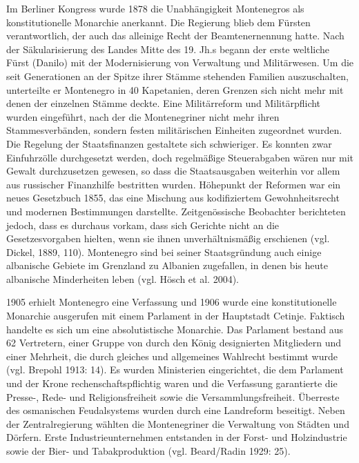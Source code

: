 Im Berliner Kongress wurde 1878 die Unabhängigkeit Montenegros als konstitutionelle Monarchie anerkannt. Die Regierung blieb dem Fürsten verantwortlich, der auch das alleinige Recht der Beamtenernennung hatte. Nach der Säkularisierung des Landes Mitte des 19. Jh.s begann der erste weltliche Fürst (Danilo) mit der Modernisierung von Verwaltung und Militärwesen. Um die seit Generationen an der Spitze ihrer Stämme stehenden Familien auszuschalten, unterteilte er Montenegro in 40 Kapetanien, deren Grenzen sich nicht mehr mit denen der einzelnen Stämme deckte. Eine Militärreform und Militärpflicht wurden eingeführt, nach der die Montenegriner nicht mehr ihren Stammesverbänden, sondern festen militärischen Einheiten zugeordnet wurden. Die Regelung der Staatsfinanzen gestaltete sich schwieriger. Es konnten zwar Einfuhrzölle durchgesetzt werden, doch regelmäßige Steuerabgaben wären nur mit Gewalt durchzusetzen gewesen, so dass die Staatsausgaben weiterhin vor allem aus russischer Finanzhilfe bestritten wurden. Höhepunkt der Reformen war ein neues Gesetzbuch 1855, das eine Mischung aus kodifiziertem Gewohnheitsrecht und modernen Bestimmungen darstellte. Zeitgenössische Beobachter berichteten jedoch, dass es durchaus vorkam, dass sich Gerichte nicht an die Gesetzesvorgaben hielten, wenn sie ihnen unverhältnismäßig erschienen (vgl. Dickel, 1889, 110). Montenegro sind bei seiner Staatsgründung auch einige albanische Gebiete im Grenzland zu Albanien zugefallen, in denen bis heute albanische Minderheiten leben (vgl. Hösch et al. 2004).\par
1905 erhielt Montenegro eine Verfassung und 1906 wurde eine konstitutionelle Monarchie ausgerufen mit einem Parlament in der Hauptstadt Cetinje. Faktisch handelte es sich um eine absolutistische Monarchie. Das Parlament bestand aus 62 Vertretern, einer Gruppe von durch den König designierten Mitgliedern und einer Mehrheit, die durch gleiches und allgemeines Wahlrecht bestimmt wurde (vgl. Brepohl 1913: 14). Es wurden Ministerien eingerichtet, die dem Parlament und der Krone rechenschaftspflichtig waren und die Verfassung garantierte die Presse-, Rede- und Religionsfreiheit sowie die Versammlungsfreiheit. Überreste des osmanischen Feudalsystems wurden durch eine Landreform beseitigt. Neben der Zentralregierung wählten die Montenegriner die Verwaltung von Städten und Dörfern. Erste Industrieunternehmen entstanden in der Forst- und Holzindustrie sowie der Bier- und Tabakproduktion (vgl. Beard/Radin 1929: 25).\par

